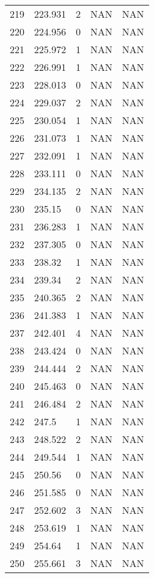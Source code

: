 \documentclass{article}
\begin{document}
\begin{longtable}{@{}lllll@{}}
				219 & 223.931 & 2    & NAN  & NAN  \\
				220 & 224.956 & 0    & NAN  & NAN  \\
				221 & 225.972 & 1    & NAN  & NAN  \\
				222 & 226.991 & 1    & NAN  & NAN  \\
				223 & 228.013 & 0    & NAN  & NAN  \\
				224 & 229.037 & 2    & NAN  & NAN  \\
				225 & 230.054 & 1    & NAN  & NAN  \\
				226 & 231.073 & 1    & NAN  & NAN  \\
				227 & 232.091 & 1    & NAN  & NAN  \\
				228 & 233.111 & 0    & NAN  & NAN  \\
				229 & 234.135 & 2    & NAN  & NAN  \\
				230 & 235.15  & 0    & NAN  & NAN  \\
				231 & 236.283 & 1    & NAN  & NAN  \\
				232 & 237.305 & 0    & NAN  & NAN  \\
				233 & 238.32  & 1    & NAN  & NAN  \\
				234 & 239.34  & 2    & NAN  & NAN  \\
				235 & 240.365 & 2    & NAN  & NAN  \\
				236 & 241.383 & 1    & NAN  & NAN  \\
				237 & 242.401 & 4    & NAN  & NAN  \\
				238 & 243.424 & 0    & NAN  & NAN  \\
				239 & 244.444 & 2    & NAN  & NAN  \\
				240 & 245.463 & 0    & NAN  & NAN  \\
				241 & 246.484 & 2    & NAN  & NAN  \\
				242 & 247.5   & 1    & NAN  & NAN  \\
				243 & 248.522 & 2    & NAN  & NAN  \\
				244 & 249.544 & 1    & NAN  & NAN  \\
				245 & 250.56  & 0    & NAN  & NAN  \\
				246 & 251.585 & 0    & NAN  & NAN  \\
				247 & 252.602 & 3    & NAN  & NAN  \\
				248 & 253.619 & 1    & NAN  & NAN  \\
				249 & 254.64  & 1    & NAN  & NAN  \\
				250 & 255.661 & 3    & NAN  & NAN  \\

\end{longtable}
\end{document}
